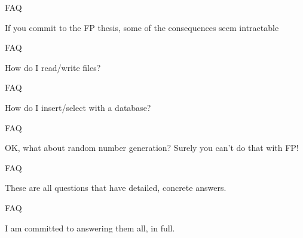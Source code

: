 \begin{frame}
\begin{block}{FAQ}
\begin{center}
If you commit to the FP thesis, some of the consequences seem intractable
\end{center}
\end{block}
\end{frame}

\begin{frame}
\begin{block}{FAQ}
\begin{center}
How do I read/write files?
\end{center}
\end{block}
\end{frame}

\begin{frame}
\begin{block}{FAQ}
\begin{center}
How do I insert/select with a database?
\end{center}
\end{block}
\end{frame}

\begin{frame}
\begin{block}{FAQ}
\begin{center}
OK, what about random number generation? Surely you can't do that with FP!
\end{center}
\end{block}
\end{frame}

\begin{frame}
\begin{block}{FAQ}
\begin{center}
These are all questions that have detailed, concrete answers.
\end{center}
\end{block}
\end{frame}

\begin{frame}
\begin{block}{FAQ}
\begin{center}
I am committed to answering them all, in full.
\end{center}
\end{block}
\end{frame}
